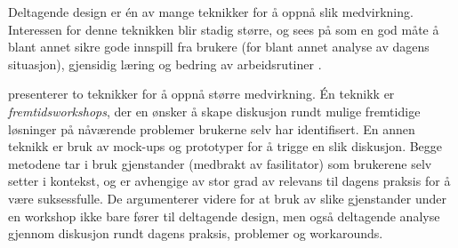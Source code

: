 \noindent
Deltagende design er én av mange teknikker for å oppnå slik medvirkning.
Interessen for denne teknikken blir stadig større, og sees på som en god måte å blant annet sikre gode innspill fra brukere (for blant annet analyse av dagens situasjon), gjensidig læring og bedring av arbeidsrutiner \citep{Mogensen92}.

\noindent
\citet{Mogensen92} presenterer to teknikker for å oppnå større medvirkning. Én teknikk er \emph{fremtidsworkshops}, der en ønsker å skape diskusjon rundt mulige fremtidige løsninger på nåværende problemer brukerne selv har identifisert. En annen teknikk er bruk av mock-ups og prototyper for å trigge en slik diskusjon. Begge metodene tar i bruk gjenstander (medbrakt av fasilitator) som brukerene selv setter i kontekst, og er avhengige av stor grad av relevans til dagens praksis for å være suksessfulle. De argumenterer videre for at bruk av slike gjenstander under en workshop ikke bare fører til deltagende design, men også deltagende analyse gjennom diskusjon rundt dagens praksis, problemer og workarounds.